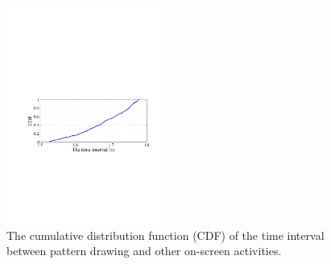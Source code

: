 \begin{figure}[!t]
    \centering
    \includegraphics[width=0.45\textwidth]{fig/time-interval.pdf}
    \caption{The cumulative distribution function (CDF) of the time interval between pattern drawing and other on-screen activities.}
    \label{fig:time-interval}
\end{figure}

